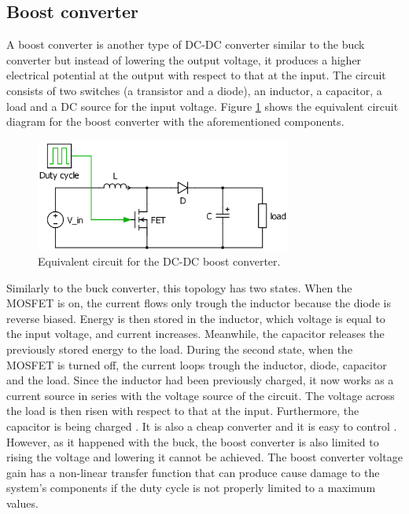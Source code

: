 \subsection{Boost converter\label{Boost-C}}

A boost converter is another type of DC-DC converter similar to the buck converter but instead of lowering the output voltage, it produces a higher electrical potential at the output with respect to that at the input. 
The circuit consists of two switches (a transistor and a diode), an inductor, a capacitor, a load and a DC source for the input voltage. Figure \ref{Boost-converter} shows the equivalent circuit diagram for the boost converter with the aforementioned components. %

\begin{figure}[H]
	\begin{center}
		\includegraphics[width=0.75\textwidth]{../Pictures/Boost-converter}
		\caption{Equivalent circuit for the DC-DC boost converter.}
		\label{Boost-converter}
	\end{center}	
\end{figure}

\vspace{1cm}
Similarly to the buck converter, this topology has two states. When the MOSFET is on, the current flows only trough the inductor because the diode  is reverse biased. Energy is then stored in the inductor, which voltage is equal to the input voltage, and current increases. Meanwhile, the capacitor releases the previously stored energy to the load.
During the second state, when the MOSFET is turned off, the current loops trough the inductor, diode, capacitor and the load. Since the inductor had been previously charged, it now works as a current source in series with the voltage source of the circuit. The voltage across the load is then risen with respect to that at the input. Furthermore, the capacitor is being charged \cite{schematicbuckandboost}. It is also a cheap converter and it is easy to control \cite{advantagebuckboost}. However, as it happened with the buck, the boost converter is also limited to rising the voltage and lowering it cannot be achieved. The boost converter voltage gain has a non-linear transfer function that can produce cause damage to the system's components if the duty cycle is not properly limited to a maximum values.
 
